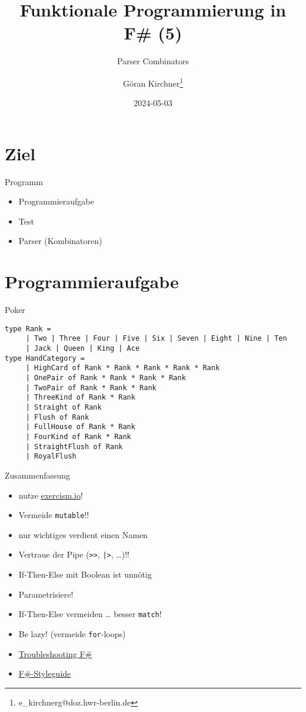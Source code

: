 \documentclass[t]{beamer}
\author{Göran Kirchner\thanks{e\_kirchnerg@doz.hwr-berlin.de}}
\date{2024-05-03}
\title{Funktionale Programmierung in F\# (5)}
\subtitle{Parser Combinators}
\begin{document}
\maketitle

\section{Ziel }
\label{sec:orgbbdf8c2}
\begin{frame}[label={sec:org7e7496f}]{Programm}
\begin{itemize}
\item Programmieraufgabe
\item Test
\item Parser (Kombinatoren)
\end{itemize}
\end{frame}

\section{Programmieraufgabe }
\label{sec:org9a68bc1}
\begin{frame}[label={sec:orgb982682},fragile]{Poker}
 \begin{verbatim}
type Rank =
     | Two | Three | Four | Five | Six | Seven | Eight | Nine | Ten 
     | Jack | Queen | King | Ace
type HandCategory =
     | HighCard of Rank * Rank * Rank * Rank * Rank
     | OnePair of Rank * Rank * Rank * Rank
     | TwoPair of Rank * Rank * Rank
     | ThreeKind of Rank * Rank
     | Straight of Rank
     | Flush of Rank
     | FullHouse of Rank * Rank
     | FourKind of Rank * Rank
     | StraightFlush of Rank
     | RoyalFlush
\end{verbatim}
\end{frame}

\begin{frame}[label={sec:org9273532},fragile]{Zusammenfassung}
 \begin{itemize}
\item nutze \href{https://exercism.io}{exercism.io}!
\item Vermeide \texttt{mutable}!!
\item nur wichtiges verdient einen Namen
\item Vertraue der \alert{Pipe} (\texttt{>{}>{}}, \texttt{|>}, \ldots{})!!
\item If-Then-Else mit Boolean ist unnötig
\item Parametrisiere!
\item If-Then-Else vermeiden \ldots{} besser \texttt{match}!
\item Be lazy! (vermeide \texttt{for}-loops)
\item \href{https://fsharpforfunandprofit.com/troubleshooting-fsharp/}{Troubleshooting F\#}
\item \href{https://docs.microsoft.com/de-de/dotnet/fsharp/style-guide/}{F\#-Styleguide}
\end{itemize}
\end{frame}
\end{document}
